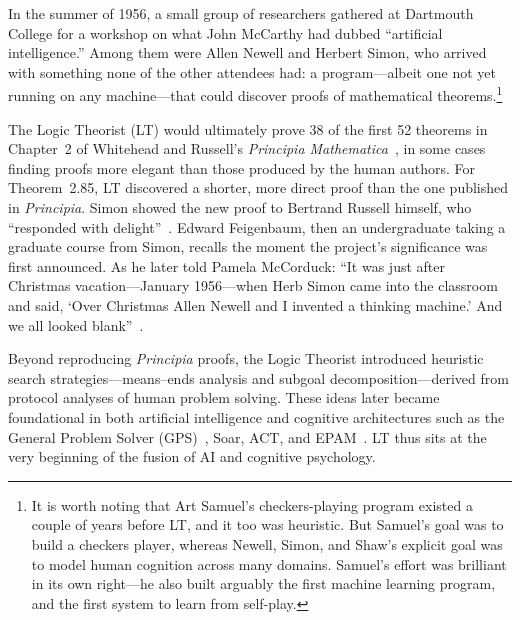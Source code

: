 \documentclass[journal]{IEEEtran}
\begin{document}
In the summer of 1956, a small group of researchers gathered at
Dartmouth College for a workshop on what John McCarthy had dubbed
``artificial intelligence.'' Among them were Allen Newell and Herbert
Simon, who arrived with something none of the other attendees had: a
program---albeit one not yet running on any machine---that could
discover proofs of mathematical theorems.\footnote{It is worth noting
that Art Samuel's checkers-playing program existed a couple of years
before LT, and it too was heuristic. But Samuel's goal was to build a
checkers player, whereas Newell, Simon, and Shaw's explicit goal was
to model human cognition across many domains. Samuel's effort was
brilliant in its own right---he also built arguably the first machine
learning program, and the first system to learn from self-play.}

The Logic Theorist (LT)\cite{LT1956a,LT1956b} would ultimately prove
38 of the first 52 theorems in Chapter~2 of Whitehead and Russell's
\textit{Principia Mathematica}~\cite{whitehead1910principia}, in some
cases finding proofs more elegant than those produced by the human
authors. For Theorem~2.85, LT discovered a shorter, more direct proof
than the one published in \textit{Principia}. Simon showed the new
proof to Bertrand Russell himself, who ``responded with
delight''~\cite[p.~167]{mccorduck2004machines}. Edward Feigenbaum,
then an undergraduate taking a graduate course from Simon, recalls the
moment the project's significance was first announced. As he later
told Pamela McCorduck: ``It was just after Christmas vacation---January
1956---when Herb Simon came into the classroom and said, `Over
Christmas Allen Newell and I invented a thinking machine.' And we all
looked blank''~\cite[p.~138]{mccorduck2004machines}.

Beyond reproducing \textit{Principia} proofs, the Logic Theorist
introduced heuristic search strategies---means--ends analysis and
subgoal decomposition---derived from protocol analyses of human
problem solving. These ideas later became foundational in both
artificial intelligence and cognitive architectures such as the
General Problem Solver (GPS)~\cite{newell1959gps}, Soar, ACT, and
EPAM~\cite{feigenbaum1961epam}. LT thus sits at the very beginning of
the fusion of AI and cognitive psychology.
\end{document}
